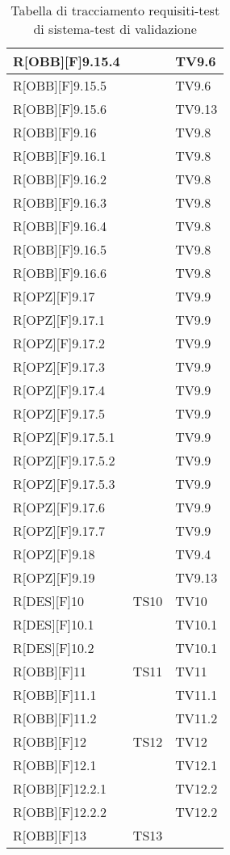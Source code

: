 	\begin{table}[h]
		\begin{tabular}{|p{}|p{}|p{}|}
			\midrule


			R[OBB][F]9.15.4 &  & TV9.6 \\ \midrule
			R[OBB][F]9.15.5 &  & TV9.6 \\ \midrule
			R[OBB][F]9.15.6 &  & TV9.13 \\ \midrule
			R[OBB][F]9.16 &  & TV9.8 \\ \midrule
			R[OBB][F]9.16.1 &  & TV9.8 \\ \midrule
			R[OBB][F]9.16.2 &  & TV9.8 \\ \midrule
			R[OBB][F]9.16.3 &  & TV9.8 \\ \midrule
			R[OBB][F]9.16.4 &  & TV9.8 \\ \midrule
			R[OBB][F]9.16.5 &  & TV9.8 \\ \midrule
			R[OBB][F]9.16.6 &  & TV9.8 \\ \midrule
			R[OPZ][F]9.17 &  & TV9.9 \\ \midrule
			R[OPZ][F]9.17.1 &  & TV9.9 \\ \midrule
			R[OPZ][F]9.17.2 &  & TV9.9 \\ \midrule
			R[OPZ][F]9.17.3 &  & TV9.9 \\ \midrule
			R[OPZ][F]9.17.4 &  & TV9.9 \\ \midrule
			R[OPZ][F]9.17.5 &  & TV9.9 \\ \midrule
			R[OPZ][F]9.17.5.1 &  & TV9.9 \\ \midrule
			R[OPZ][F]9.17.5.2 &  & TV9.9 \\ \midrule
			R[OPZ][F]9.17.5.3 &  & TV9.9 \\ \midrule
			R[OPZ][F]9.17.6 &  & TV9.9 \\ \midrule
			R[OPZ][F]9.17.7 &  & TV9.9 \\ \midrule
			R[OPZ][F]9.18 &  & TV9.4 \\ \midrule
			R[OPZ][F]9.19 &  & TV9.13 \\ \midrule
			R[DES][F]10 & TS10 & TV10 \\ \midrule
			R[DES][F]10.1 &  & TV10.1 \\ \midrule
			R[DES][F]10.2 &  & TV10.1 \\ \midrule
			R[OBB][F]11 & TS11 & TV11  \\ \midrule
			R[OBB][F]11.1 &  & TV11.1 \\ \midrule
			R[OBB][F]11.2 &  & TV11.2 \\ \midrule
			R[OBB][F]12 & TS12 & TV12 \\ \midrule
			R[OBB][F]12.1 &  & TV12.1 \\ \midrule
			R[OBB][F]12.2.1 &  & TV12.2 \\ \midrule
			R[OBB][F]12.2.2 &  & TV12.2 \\ \midrule
			R[OBB][F]13 & TS13 &  \\

	
			\bottomrule
	
		\end{tabular}
		\caption{Tabella di tracciamento requisiti-test di sistema-test di validazione}
	\end{table}
	\newpage